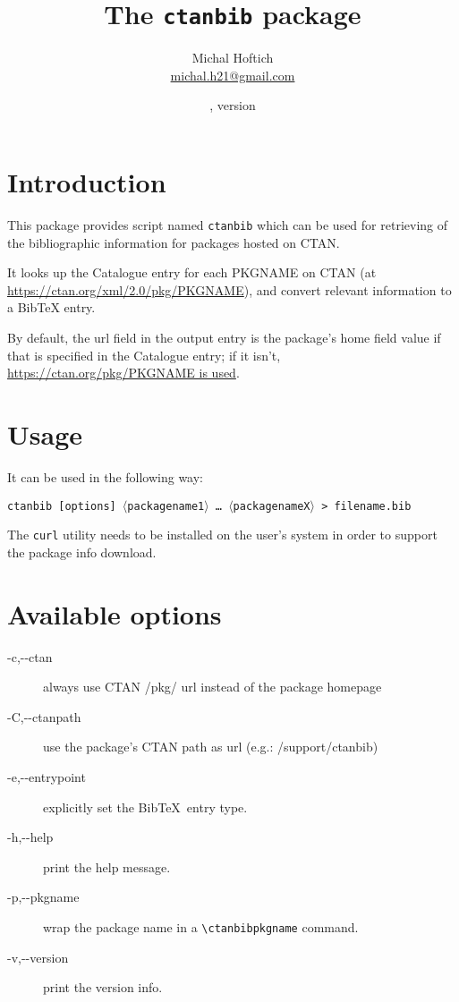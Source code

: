 \documentclass[11pt]{ltxdoc}
\title{The \texttt{ctanbib} package}
\author{Michal Hoftich\\\href{mailto:michal.h21@gmail.com}{michal.h21@gmail.com}}
\date{\gitdate, version \gitversion}
\newcommand\package[1]{\texttt{#1}}
\begin{document}
\maketitle

\section{Introduction}
This package provides script named \package{ctanbib} which can be used for retrieving of the bibliographic information for packages hosted on CTAN.

It looks up the Catalogue entry for each PKGNAME on CTAN (at
\url{https://ctan.org/xml/2.0/pkg/PKGNAME}), and convert relevant information
to a BibTeX entry.

By default, the url field in the output entry is the package's home
field value if that is specified in the Catalogue entry; if it isn't,
\url{https://ctan.org/pkg/PKGNAME is used}.

\section{Usage}


It can be used in the following way:


\medskip

\noindent\package{ctanbib [options]  $\langle$packagename1$\rangle$ \ldots\ $\langle$packagenameX$\rangle$ > filename.bib}

\medskip

The \texttt{curl} utility needs to be installed on the user's system in order to support the package info download.


\section{Available options}

\begin{description}
  \item[-c,-\/-ctan] always use CTAN /pkg/ url instead of the package homepage 
  \item[-C,-\/-ctanpath] use the package's CTAN path as url (e.g.: /support/ctanbib)
  \item[-e,-\/-entrypoint] explicitly set the Bib\TeX\ entry type.
  \item[-h,-\/-help] print the help message.
  \item[-p,-\/-pkgname] wrap the package name in a \verb|\ctanbibpkgname| command.
  \item[-v,-\/-version] print the version info.
\end{description}
\end{document}
